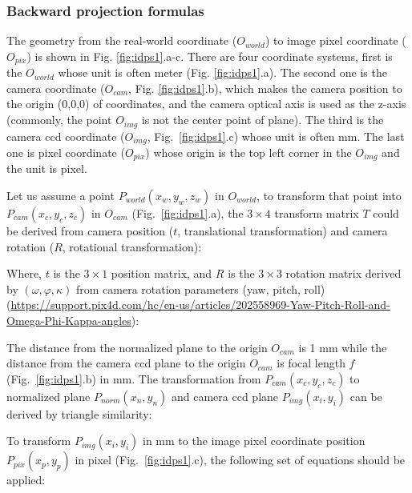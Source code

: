 

\subsubsection{Backward projection formulas}

The geometry from the real-world coordinate ($O_{world}$) to image pixel coordinate ($O_{pix}$) is shown in Fig. \ref{fig:idps1}.a-c. There are four coordinate systems, first is the $O_{world}$ whose unit is often meter (Fig. \ref{fig:idps1}.a). The second one is the camera coordinate ($O_{cam}$, Fig. \ref{fig:idps1}.b), which makes the camera position to the origin (0,0,0) of coordinates, and the camera optical axis is used as the z-axis (commonly, the point $O_{img}$ is not the center point of plane). The third is the camera \gls{ccd} coordinate ($O_{img}$, Fig.~\ref{fig:idps1}.c) whose unit is often mm. The last one is pixel coordinate ($O_{pix}$) whose origin is the top left corner in the $O_{img}$ and the unit is pixel.

Let us assume a point $P_{world} (x_w,y_w,z_w)$ in $O_{world}$, to transform that point into $P_{cam} (x_c,y_c,z_c)$ in $O_{cam}$ (Fig.~\ref{fig:idps1}.a), the $3\times4$ transform matrix $T$ could be derived from camera position ($t$, translational transformation) and camera rotation ($R$, rotational transformation):



\noindent 
Where, $t$ is the $3\times1$ position matrix, and $R$ is the $3\times3$ rotation matrix derived by $(\omega, \varphi, \kappa)$ from camera rotation parameters (yaw, pitch, roll) (\url{https://support.pix4d.com/hc/en-us/articles/202558969-Yaw-Pitch-Roll-and-Omega-Phi-Kappa-angles}):

% 

The distance from the normalized plane to the origin $O_{cam}$  is 1 mm while the distance from the camera \gls{ccd} plane to the origin $O_{cam}$ is focal length $f$ (Fig.~\ref{fig:idps1}.b) in mm. The transformation from $P_{cam}(x_c,y_c,z_c)$ to normalized plane $P_{norm} (x_n,y_n)$ and camera \gls{ccd} plane $P_{img} (x_i,y_i)$ can be derived by triangle similarity:



To transform $P_{img} (x_i,y_i)$ in mm to the image pixel coordinate position $P_{pix} (x_p,y_p)$ in pixel (Fig.~\ref{fig:idps1}.c), the following set of equations should be applied:

